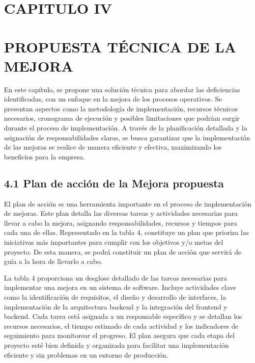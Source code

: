 \newpage

\section{CAPITULO IV}
\section*{PROPUESTA TÉCNICA DE LA MEJORA}
En este capítulo, se propone una solución técnica para abordar las deficiencias identificadas, con un enfoque en la mejora de los procesos operativos. Se presentan aspectos como la metodología de implementación, recursos técnicos necesarios, cronograma de ejecución y posibles limitaciones que podrían surgir durante el proceso de implementación. A través de la planificación detallada y la asignación de responsabilidades claras, se busca garantizar que la implementación de las mejoras se realice de manera eficiente y efectiva, maximizando los beneficios para la empresa.


\subsection{4.1 Plan de acción de la Mejora propuesta}

El plan de acción es una herramienta importante en el proceso de implementación de mejoras. Este plan detalla las diversas tareas y actividades necesarias para llevar a cabo la mejora, asignando responsabilidades, recursos y tiempos para cada una de ellas. Representado en la tabla 4, constituye un plan que prioriza las iniciativas más importantes para cumplir con los objetivos y/o metas del proyecto. De esta manera, se podrá constituir un plan de acción que servirá de guía a la hora de llevarlo a cabo.

La tabla 4 proporciona un desglose detallado de las tareas necesarias para implementar una mejora en un sistema de software. Incluye actividades clave como la identificación de requisitos, el diseño y desarrollo de interfaces, la implementación de la arquitectura backend y la integración del frontend y backend. Cada tarea está asignada a un responsable específico y se detallan los recursos necesarios, el tiempo estimado de cada actividad y los indicadores de seguimiento para monitorear el progreso. El plan asegura que cada etapa del proyecto esté bien definida y organizada para facilitar una implementación eficiente y sin problemas en un entorno de producción.

